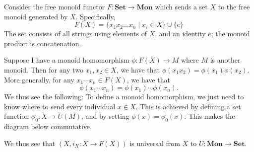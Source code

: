     \begin{example} 
        Consider the free monoid functor $F: \textbf{Set} \to \textbf{Mon}$ which 
        sends a set $X$ to the free monoid generated by $X$. Specifically, 
        \[
            F(X) = \{x_1x_2 \dots x_n \mid x_i \in X \} \cup \{e\}
        \]
        The set consists of all strings using elements of $X$, and an identity $e$; 
        the monoid product is concatenation.

        Suppose I have a monoid homomorphism $\phi: F(X) \to M$ where $M$ is another monoid. 
        Then for any two $x_1, x_2 \in X$, we have that 
        $\phi(x_1x_2) = \phi(x_1)\phi(x_2)$. More generally, for any $x_1\cdots x_n \in F(X)$, 
        we have that 
        \[
            \phi(x_1 \cdots x_n) = \phi(x_1)\cdots \phi(x_n).
        \]
        We thus see the following: To define a monoid homomorphism, we just need to know where 
        to send every individual $x \in X$. This is achieved by 
        defining a set function $\phi_0: X \to U(M)$, and by setting 
        $\phi(x) = \phi_0(x)$. This makes the 
        diagram below commutative.
        \begin{center}
            \hspace{1cm}
        \end{center}
        We thus see that $(X, i_X: X \to F(X))$ is universal from $X$ to $U: \textbf{Mon} \to \textbf{Set}$. 
    \end{example}

